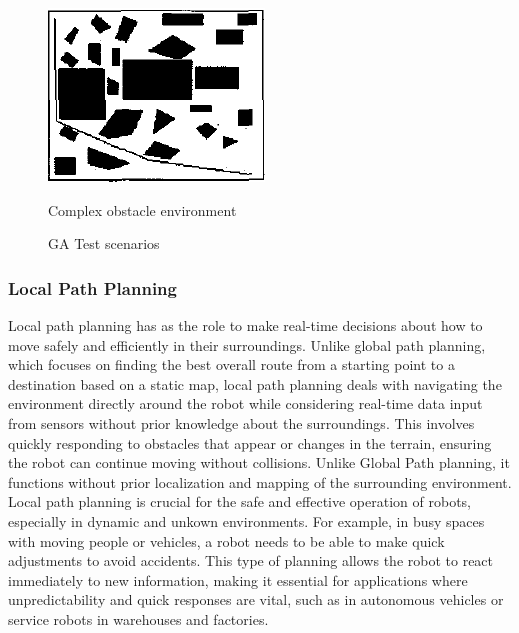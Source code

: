 \begin{figure}[h!]
\begin{minipage}{0.30\textwidth}
        \label{Intermediate obstacle environment}
    \end{minipage}
    \begin{minipage}{0.30\textwidth}
        \centering
        \includegraphics[width=\linewidth]{images/Chap1/R17_complex.png} %
        \caption{Complex obstacle environment}
        \label{Complex obstacle environment}
    \end{minipage}
    \caption{GA Test scenarios \cite{R17}}
    \label{R17 test scenarios}
\end{figure}

\subsubsection {Local Path Planning}
Local path planning has as the role to make real-time decisions about how to move 
safely and efficiently in their surroundings. Unlike global path planning, which focuses on 
finding the best overall route from a starting point to a destination based on a static map, local path 
planning deals with navigating the environment directly around the robot while considering real-time
data input from sensors without prior knowledge about the surroundings\cite{R18}. This involves quickly 
responding to obstacles that appear or changes in the terrain, ensuring the robot can 
continue moving without collisions. Unlike Global Path planning, it functions without prior localization
and mapping of the surrounding environment. Local path planning is crucial for the safe and effective 
operation of robots, especially in 
dynamic and unkown environments. For example, in busy spaces with moving people 
or vehicles, a robot needs to be able to make quick adjustments to avoid accidents. This type of 
planning allows the robot to react immediately to new information, making it essential for applications 
where unpredictability and quick responses are vital, such as in autonomous vehicles or service robots in 
warehouses and factories.

